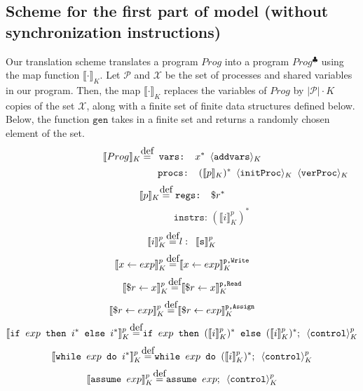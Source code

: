\documentclass{article}
\newcommand\myeq{\stackrel{\mathclap{\normalfont\mbox{def}}}{=}}
\begin{document}
\subsection{Scheme for the first part of model (without synchronization instructions)}
Our translation scheme translates a program $Prog$ into a program $Prog^\clubsuit$ using the map function $\llbracket\cdot\rrbracket_K$. Let $\mathcal{P}$ and $\mathcal{X}$ be the set of processes and shared variables in our program. Then, the map $\llbracket\cdot\rrbracket_K$ replaces the variables of $Prog$ by $|\mathcal{P}|\cdot K$ copies of the set $\mathcal{X}$, along with a finite set of finite data structures defined below. Below, the function $\texttt{gen}$ takes in a finite set and returns a randomly chosen element of the set.\\
$$\llbracket Prog \rrbracket_K \myeq \texttt{ vars: }x^* \hspace{0.5em} \langle \texttt{addvars} \rangle_K$$
\vspace{-2em}
$$\qquad\qquad\qquad\qquad\kern 6.5em\texttt{procs: }(\llbracket p \rrbracket_K)^* \kern 0.5em \langle \texttt{initProc} \rangle_K \kern 0.5em \langle \texttt{verProc} \rangle_K$$
$$\llbracket p \rrbracket_K \myeq \;\texttt{regs: } \$r^*$$
\vspace{-2em}
$$\qquad\qquad\qquad\texttt{instrs: } (\llbracket i \rrbracket_K^p)^*$$
$$\llbracket i \rrbracket_K^p \myeq l: \kern 0.5em \llbracket \texttt{s} \rrbracket_K^p $$
$$\llbracket x \leftarrow exp \rrbracket_K^p \myeq \llbracket x \leftarrow exp \rrbracket_K^\texttt{p,Write}$$ 
\vspace{-1.2em}
$$\llbracket \$r \leftarrow x \rrbracket_K^p \myeq \llbracket \$r \leftarrow x \rrbracket_K^\texttt{p,Read}$$
\vspace{-1.2em}
$$\llbracket \$r \leftarrow exp \rrbracket_K^p \myeq \llbracket \$r \leftarrow exp \rrbracket_K^\texttt{p,Assign} $$
\vspace{-1.2em}
$$\llbracket \texttt{if } exp \texttt{ then }i^* \texttt{ else }i^* \rrbracket_K^p \myeq \texttt{if } exp \texttt{ then } (\llbracket i  \rrbracket_K^p)^* \texttt{ else } (\llbracket i \rrbracket_K^p)^*; \kern 0.5em \langle \texttt{control} \rangle_K^p$$
\vspace{-1.2em}
$$\llbracket \texttt{while } exp \texttt{ do }i^* \rrbracket_K^p \myeq \texttt{while } exp \texttt{ do } (\llbracket i \rrbracket_K^p)^*; \kern 0.5em \langle \texttt{control} \rangle_K^p$$
\vspace{-1.2em}
$$\llbracket \texttt{assume } exp \rrbracket_K^p \myeq \texttt{assume } exp ; \kern 0.5em \langle \texttt{control} \rangle_K^p$$
\end{document}
